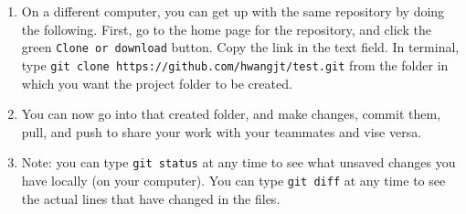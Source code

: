 \documentclass{article}
\begin{document}
\begin{enumerate}
    \item On a different computer, you can get up with the same repository by doing the following. First, go to the home page for the repository, and click the green \texttt{Clone or download} button. Copy the link in the text field. In terminal, type \texttt{git clone https://github.com/hwangjt/test.git} from the folder in which you want the project folder to be created.
    \item You can now go into that created folder, and make changes, commit them, pull, and push to share your work with your teammates and vise versa.
    \item Note: you can type \texttt{git status} at any time to see what unsaved changes you have locally (on your computer). You can type \texttt{git diff} at any time to see the actual lines that have changed in the files.
\end{enumerate}
\end{document}

